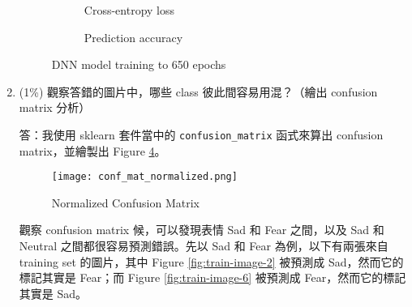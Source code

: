 \documentclass[12pt,a4paper]{extarticle}
\begin{document}
\begin{enumerate}
  \begin{figure}[H]
    \begin{subfigure}[t]{.5\textwidth}
      \caption{Cross-entropy loss}
      \label{fig:dnn-epoch-loss-650}
    \end{subfigure}
    \begin{subfigure}[t]{.5\textwidth}
      \caption{Prediction accuracy}
      \label{fig:dnn-epoch-acc-650}
    \end{subfigure}
    \caption{DNN model training to 650 epochs}
    \label{fig:dnn-training-650}
  \end{figure}

  \newpage

	\item (1\%) 觀察答錯的圖片中，哪些 class 彼此間容易用混？（繪出 confusion matrix 分析）
	\par 答：我使用 sklearn 套件當中的 \texttt{confusion\_matrix} 函式來算出 confusion matrix，並繪製出 Figure \ref{fig:confusioin-matrix}。

  \begin{figure}[ht]
    \centering
    \texttt{[image: conf\_mat\_normalized.png]}
    \caption{Normalized Confusion Matrix}
    \label{fig:confusioin-matrix}
  \end{figure}

  \par 觀察 confusion matrix 候，可以發現表情 Sad 和 Fear 之間，以及 Sad 和 Neutral 之間都很容易預測錯誤。先以 Sad 和 Fear 為例，以下有兩張來自 training set 的圖片，其中 Figure \ref{fig:train-image-2} 被預測成 Sad，然而它的標記其實是 Fear；而 Figure \ref{fig:train-image-6} 被預測成 Fear，然而它的標記其實是 Sad。


\end{enumerate}
\end{document}

